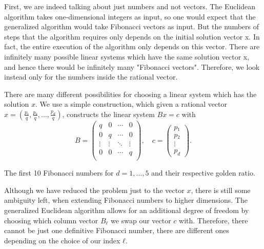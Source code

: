 First, we are indeed talking about just numbers and not vectors.
The Euclidean algorithm takes one-dimensional integers as input, so one would
expect that the generalized algorithm would take Fibonacci vectors as input.
But the numbers of steps that the algorithm requires only depends on the
initial solution vector x.
In fact, the entire execution of the algorithm only depends on this vector.
There are infinitely many possible linear systems which have the same solution
vector x, and hence there would be infinitely many "Fibonacci vectors".
Therefore, we look instead only for the numbers inside the rational vector.

There are many different possibilities for choosing a linear system which has the solution $x$.
We use a simple construction, which
given a rational vector $x = \left(\frac{p₁}{q}, \frac{p₂}{q}, …, \frac{p_d}{q}\right)$,
constructs the linear system $Bx = c$ with
\begin{equation}
  \label{eq:linear-system-construction}
  B =
  \begin{pmatrix}
    q & 0 & ⋯ & 0 \\
    0 & q & ⋯ & 0 \\
    ⋮ & ⋮ & ⋱ & ⋮ \\
    0 & 0 & ⋯ & q \\
  \end{pmatrix},
  \quad
  c =
  \begin{pmatrix}
    p₁ \\
    p₂ \\
    ⋮ \\
    p_d
  \end{pmatrix}.
\end{equation}

\begin{table}[tbp]
  \caption{The first 10 Fibonacci numbers for $d = 1, …, 5$ and their respective golden ratio.}
  \label{tbl:min-fibonacci}
  \centering
  
\end{table}


Although we have reduced the problem just to the vector $x$, there is still
some ambiguity left, when extending Fibonacci numbers to higher dimensions.
The generalized Euclidean algorithm allows for an additional degree of freedom
by choosing which column vector $B_ℓ$ we swap our vector $c$ with.
Therefore, there cannot be just one definitive Fibonacci number, there are
different ones depending on the choice of our index $ℓ$.

